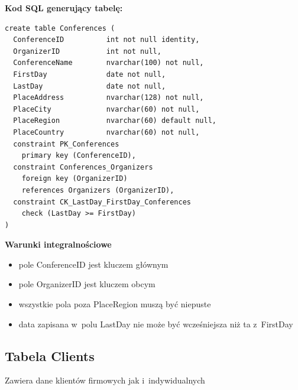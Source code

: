 \documentclass[12pt, a4paper]{mwrep}
\begin{document}
\vspace{0.5cm}
\noindent \textbf{Kod SQL generujący tabelę:}

\begin{lstlisting}
create table Conferences (
  ConferenceID          int not null identity,
  OrganizerID           int not null,
  ConferenceName        nvarchar(100) not null,
  FirstDay              date not null,
  LastDay               date not null,
  PlaceAddress          nvarchar(128) not null,
  PlaceCity             nvarchar(60) not null,
  PlaceRegion           nvarchar(60) default null,
  PlaceCountry          nvarchar(60) not null,
  constraint PK_Conferences 
    primary key (ConferenceID),
  constraint Conferences_Organizers 
    foreign key (OrganizerID) 
    references Organizers (OrganizerID),
  constraint CK_LastDay_FirstDay_Conferences 
    check (LastDay >= FirstDay)
)
\end{lstlisting}

\vspace{0.5cm}

\noindent \textbf{Warunki integralnościowe}
\begin{itemize}
  \item pole ConferenceID jest kluczem głównym
  \item pole OrganizerID jest kluczem obcym
  \item wszystkie pola poza PlaceRegion muszą być niepuste
  \item data zapisana w~polu LastDay nie może być wcześniejsza niż ta z~FirstDay
\end{itemize}

\newpage
\subsection{Tabela Clients}

\noindent Zawiera dane klientów firmowych jak i~indywidualnych

\vspace{0.5cm}
\end{document}
